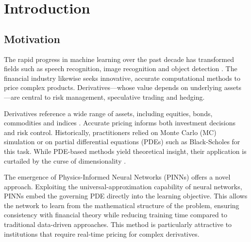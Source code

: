 \documentclass[12pt]{report} %
\theoremstyle{plain} %
\theoremstyle{definition} %
\theoremstyle{remark} %
\begin{document}
	\newpage %
	\thispagestyle{empty}
	\mbox{}
	


\tableofcontents
\thispagestyle{fancy}

\newpage %
\thispagestyle{empty}
\mbox{}

\listoffigures
\thispagestyle{fancy}

\newpage %
\thispagestyle{empty}
\mbox{}

\listoftables
\thispagestyle{fancy}

\newpage %
\thispagestyle{empty}
\mbox{}


\clearpage
{} %

\chapter{Introduction}

\section{Motivation}

The rapid progress in machine learning over the past decade has transformed
fields such as speech recognition, image recognition and object detection \cite{lecun}.
The financial industry likewise seeks innovative, accurate computational methods
to price complex products. Derivatives—whose value depends on underlying assets
\cite{alma99148840908702021}—are central to risk management, speculative trading and hedging.

Derivatives reference a wide range of assets, including equities, bonds, commodities and indices
\cite{Wilmott2010PaulWO}. Accurate pricing informs both investment decisions and risk control.
Historically, practitioners relied on Monte Carlo (MC) simulation \cite{glasserman2004monte} or
on partial differential equations (PDEs) such as Black-Scholes \cite{blackscholes} for this task.
While PDE-based methods yield theoretical insight, their application is curtailed by the curse of dimensionality \cite{bellman1966dynamic}.

The emergence of Physics-Informed Neural Networks (PINNs) \cite{RAISSI2019686}
offers a novel approach. Exploiting the universal-approximation capability of neural networks,
PINNs embed the governing PDE directly into the learning objective. This allows
the network to learn from the mathematical structure of the problem, ensuring consistency
with financial theory while reducing training time compared to traditional data-driven approaches. This method is particularly attractive to
institutions that require real-time pricing for complex derivatives.
\end{document}
